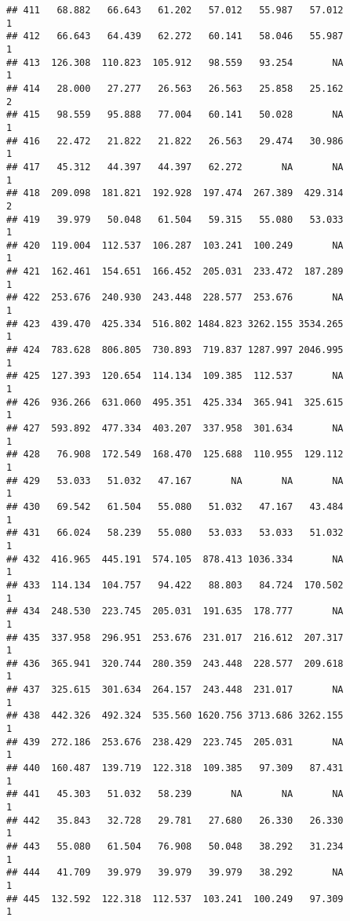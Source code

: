\documentclass[
]{article}
\begin{document}
\begin{verbatim}
## 411   68.882   66.643   61.202   57.012   55.987   57.012             1
## 412   66.643   64.439   62.272   60.141   58.046   55.987             1
## 413  126.308  110.823  105.912   98.559   93.254       NA             1
## 414   28.000   27.277   26.563   26.563   25.858   25.162             2
## 415   98.559   95.888   77.004   60.141   50.028       NA             1
## 416   22.472   21.822   21.822   26.563   29.474   30.986             1
## 417   45.312   44.397   44.397   62.272       NA       NA             1
## 418  209.098  181.821  192.928  197.474  267.389  429.314             2
## 419   39.979   50.048   61.504   59.315   55.080   53.033             1
## 420  119.004  112.537  106.287  103.241  100.249       NA             1
## 421  162.461  154.651  166.452  205.031  233.472  187.289             1
## 422  253.676  240.930  243.448  228.577  253.676       NA             1
## 423  439.470  425.334  516.802 1484.823 3262.155 3534.265             1
## 424  783.628  806.805  730.893  719.837 1287.997 2046.995             1
## 425  127.393  120.654  114.134  109.385  112.537       NA             1
## 426  936.266  631.060  495.351  425.334  365.941  325.615             1
## 427  593.892  477.334  403.207  337.958  301.634       NA             1
## 428   76.908  172.549  168.470  125.688  110.955  129.112             1
## 429   53.033   51.032   47.167       NA       NA       NA             1
## 430   69.542   61.504   55.080   51.032   47.167   43.484             1
## 431   66.024   58.239   55.080   53.033   53.033   51.032             1
## 432  416.965  445.191  574.105  878.413 1036.334       NA             1
## 433  114.134  104.757   94.422   88.803   84.724  170.502             1
## 434  248.530  223.745  205.031  191.635  178.777       NA             1
## 435  337.958  296.951  253.676  231.017  216.612  207.317             1
## 436  365.941  320.744  280.359  243.448  228.577  209.618             1
## 437  325.615  301.634  264.157  243.448  231.017       NA             1
## 438  442.326  492.324  535.560 1620.756 3713.686 3262.155             1
## 439  272.186  253.676  238.429  223.745  205.031       NA             1
## 440  160.487  139.719  122.318  109.385   97.309   87.431             1
## 441   45.303   51.032   58.239       NA       NA       NA             1
## 442   35.843   32.728   29.781   27.680   26.330   26.330             1
## 443   55.080   61.504   76.908   50.048   38.292   31.234             1
## 444   41.709   39.979   39.979   39.979   38.292       NA             1
## 445  132.592  122.318  112.537  103.241  100.249   97.309             1

\end{verbatim}
\end{document}
